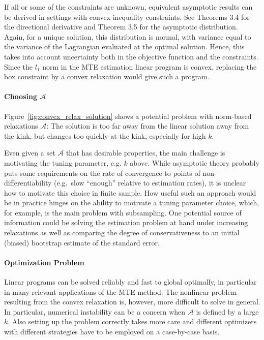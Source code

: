 \documentclass[12pt,a4paper,english]{article} %
\numberwithin{equation}{section}
\theoremstyle{definition}
\theoremstyle{remark}
\theoremstyle{plain}
\begin{document}
If all or some of the constraints are unknown, equivalent asymptotic results can be derived in settings with convex inequality constraints.
See Theorems 3.4 for the directional derivative and Theorem 3.5 for the asymptotic distribution.
Again, for a unique solution, this distribution is normal, with variance equal to the variance of the Lagrangian evaluated at the optimal solution.
Hence, this takes into account uncertainty both in the objective function and the constraints.
Since the $l_1$ norm in the MTE estimation linear program is convex, replacing the box constraint by a convex relaxation would give such a program.

\paragraph{Choosing $\mathcal{A}$}
Figure~\ref{fig:convex_relax_solution} shows a potential problem with norm-based relaxations $\mathcal{A}$:
The solution is too far away from the linear solution away from the kink, but changes too quickly at the kink, especially for high $k$.

Even given a set $\mathcal{A}$ that has desirable properties, the main challenge is motivating the tuning parameter, e.g. $k$ above.
While asymptotic theory probably puts some requirements on the rate of convergence to points of non-differentiability (e.g.\ slow ``enough'' relative to estimation rates), it is unclear how to motivate this choice in finite sample.
How useful such an approach would be in practice hinges on the ability to motivate a tuning parameter choice, which, for example, is the main problem with subsampling.
One potential source of information could be solving the estimation problem at hand under increasing relaxations as well as comparing the degree of conservativeness to an initial (biased) bootstrap estimate of the standard error.

\paragraph{Optimization Problem}
Linear programs can be solved reliably and fast to global optimally, in particular in many relevant applications of the MTE method.
The nonlinear problem resulting from the convex relaxation is, however, more difficult to solve in general.
In particular, numerical instability can be a concern when $\mathcal{A}$ is defined by a large $k$.
Also setting up the problem correctly takes more care and different optimizers with different strategies have to be employed on a case-by-case basis.
\end{document}
